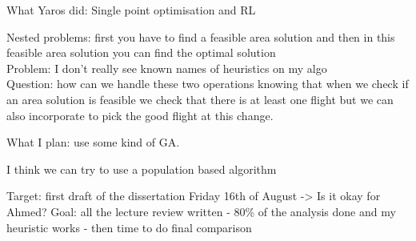 What Yaros did: Single point optimisation and RL

Nested problems: first you have to find a feasible area solution and then in this feasible area solution you can find the optimal solution
\\Problem: I don't really see known names of heuristics on my algo
\\Question: how can we handle these two operations knowing that when we check if an area solution is feasible we check that there is at least one flight but we can also incorporate to pick the good flight at this change.

What I plan: use some kind of GA. 

I think we can try to use a population based algorithm 

Target: first draft of the dissertation Friday 16th of August -> Is it okay for Ahmed?
Goal: all the lecture review written - 80\% of the analysis done and my heuristic works - then time to do final comparison